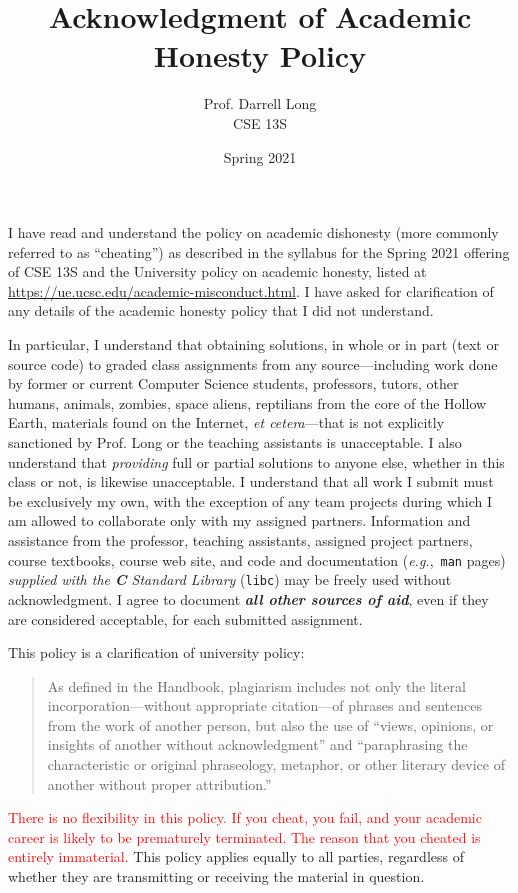 \documentclass{article}
\title{Acknowledgment of Academic Honesty Policy}
\author{Prof.\xspace Darrell Long \\
CSE 13S}
\date{Spring 2021}
\newcommand{\surl}[1]{{\fontsize{9}{11}\selectfont\url{#1}}}
\begin{document}
\maketitle
I have read and understand the policy on academic dishonesty (more
commonly referred to as ``cheating'') as described in the syllabus
for the Spring 2021 offering of CSE 13S
and the University policy on academic honesty, listed at
\surl{https://ue.ucsc.edu/academic-misconduct.html}.  I have asked for
clarification of any details of the academic honesty policy that I
did not understand.

In particular, I understand that obtaining solutions, in whole or
in part (text or source code) to graded class assignments from any
source---including work done by former or current Computer Science
students, professors, tutors, other humans, animals, zombies, space
aliens, reptilians from the core of the Hollow Earth,
materials found on the Internet, \emph{et cetera}---that
is not explicitly sanctioned by Prof.\xspace Long or the teaching assistants is unacceptable.
I also understand that \emph{providing} full or partial solutions
to anyone else, whether in this class or not, is likewise unacceptable.
I understand that all work I submit must be exclusively my own,
with the exception of any team projects during which I am allowed
to collaborate only with my assigned partners.  Information and
assistance from the professor, teaching assistants, assigned project partners, course
textbooks, course web site, and code and documentation
(\emph{e.g.},~\texttt{man} pages) \emph{supplied with the \textbf{C} Standard
Library} (\texttt{libc})
may be freely used without acknowledgment.  I agree to document
\textbf{\emph{all other sources of aid}}, even if they are considered
acceptable, for each submitted assignment.

This policy is a clarification of university policy:
\begin{quote}
As defined in the Handbook, plagiarism includes not only the literal
incorporation---without appropriate citation---of phrases and
sentences from the work of another person, but also the use of
``views, opinions, or insights of another without acknowledgment''
and ``paraphrasing the characteristic or original phraseology,
metaphor, or other literary device of another without proper
attribution.''
\end{quote}


\textcolor{red}{There is no flexibility in this policy. If you
cheat, you fail, and your academic career is likely to be prematurely
terminated. The reason that you cheated is entirely immaterial.}
This policy applies equally to all parties, regardless of whether
they are transmitting or receiving the material in question.
\end{document}
